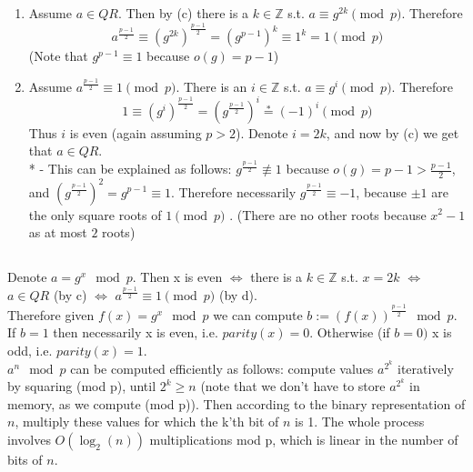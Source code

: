 \documentclass{article}
\begin{document}
\begin{enumerate}[i]
\item Assume $a\in QR$. Then by (c) there is a $k\in\mathbb{Z}$ s.t. $a\equiv g^{2k}\pmod p$.
Therefore
\[
a^{\frac{p-1}{2}}\equiv\left(g^{2k}\right)^{\frac{p-1}{2}}=\left(g^{p-1}\right)^{k}\equiv1^{k}=1\pmod p
\]
(Note that $g^{p-1}\equiv1$ because $o\left(g\right)=p-1$)
\item Assume $a^{\frac{p-1}{2}}\equiv1\pmod p$. There is an $i\in\mathbb{Z}$
s.t. $a\equiv g^{i}\pmod p$. Therefore
\[
1\equiv\left(g^{i}\right)^{\frac{p-1}{2}}=\left(g^{\frac{p-1}{2}}\right)^{i}\overset{*}{=}\left(-1\right)^{i}\pmod p
\]
Thus $i$ is even (again assuming $p>2$). Denote $i=2k$, and now
by (c) we get that $a\in QR$.\\
{*} - This can be explained as follows: $g^{\frac{p-1}{2}}\not\equiv1$
because $o(g)=p-1>\frac{p-1}{2}$, and $\left(g^{\frac{p-1}{2}}\right)^{2}=g^{p-1}\equiv1$.
Therefore necessarily $g^{\frac{p-1}{2}}\equiv-1$, because $\pm1$
are the only square roots of $1\pmod p$ . (There are no other roots
because $x^{2}-1$ as at most $2$ roots)
\end{enumerate}

\subsection{}
Denote $a=g^{x}\mod p$. Then x is even $\iff$ there is a $k\in\mathbb{Z}$
s.t. $x=2k$ $\iff$ $a\in QR$ (by c) $\iff$ $a^{\frac{p-1}{2}}\equiv1\pmod p$
(by d).\\
Therefore given $f\left(x\right)=g^{x}\mod p$ we can compute $b:=\left(f\left(x\right)\right)^{\frac{p-1}{2}}\mod p$.
If $b=1$ then necessarily x is even, i.e. $parity(x)=0$. Otherwise
(if $b=0)$ x is odd, i.e. $parity(x)=1$.\\
$a^{n}\mod p$ can be computed efficiently as follows: compute values
$a^{2^{k}}$ iteratively by squaring (mod p), until $2^{k}\ge n$
(note that we don't have to store $a^{2^{k}}$ in memory, as we compute
(mod p)). Then according to the binary representation of $n$, multiply
these values for which the k'th bit of $n$ is 1. The whole process
involves $O\left(\log_{2}\left(n\right)\right)$ multiplications mod
p, which is linear in the number of bits of $n$.

\section{}


\end{document}
